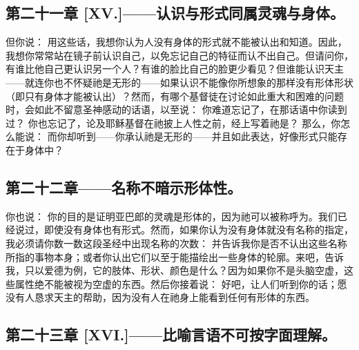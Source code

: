 \subsection{第二十一章 [XV.]——认识与形式同属灵魂与身体。}

但你说： 用这些话，我想你认为人没有身体的形式就不能被认出和知道。因此，我想你常常站在镜子前认识自己，以免忘记自己的特征而认不出自己。但请问你，有谁比他自己更认识另一个人？有谁的脸比自己的脸更少看见？但谁能认识天主——就连你也不怀疑祂是无形的——如果认识不能像你所想象的那样没有形体形状（即只有身体才能被认出）？然而，有哪个基督徒在讨论如此重大和困难的问题时，会如此不留意圣神感动的话语，以至说： 你难道忘记了，在那话语中你读到过？ 你也忘记了，论及耶稣基督在祂披上人性之前，经上写着祂是？ 那么，你怎么能说： 而你却听到——你承认祂是无形的——并且如此表达，好像形式只能存在于身体中？\par


\subsection{第二十二章——名称不暗示形体性。}

你也说： 你的目的是证明亚巴郎的灵魂是形体的，因为祂可以被称呼为。我们已经说过，即使没有身体也有形式。然而，如果你认为没有身体就没有名称的指定，我必须请你数一数这段圣经中出现名称的次数： 并告诉我你是否不认出这些名称所指的事物本身；或者你认出它们以至于能描绘出一些身体的轮廓。来吧，告诉我，只以爱德为例，它的肢体、形状、颜色是什么？因为如果你不是头脑空虚，这些属性绝不能被视为空虚的东西。然后你接着说： 好吧，让人们听到你的话；愿没有人恳求天主的帮助，因为没有人在祂身上能看到任何有形体的东西。\par


\subsection{第二十三章 [XVI.]——比喻言语不可按字面理解。}

